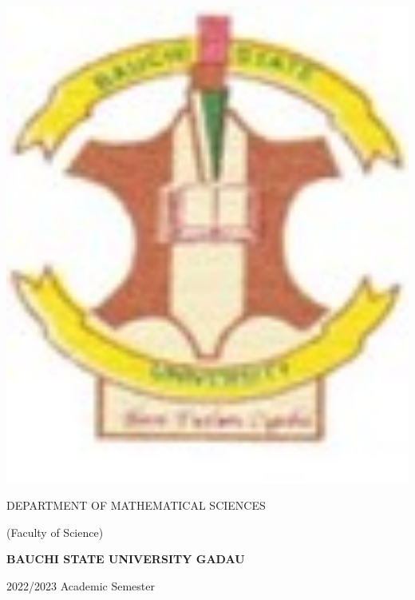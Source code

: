 \documentclass[12pt, a4paper]{exam}
\begin{document}
	\noindent
	\begin{minipage}[l]{0.1\textwidth}
		\noindent
		\includegraphics[width=1.4\textwidth]{gadau}
	\end{minipage}
\hfill
\begin{minipage}[c]{0.8\textwidth}
	\begin{center}
		{\large DEPARTMENT OF MATHEMATICAL SCIENCES \par
		\large	(Faculty of Science)	\par
	\large \textbf{BAUCHI STATE UNIVERSITY GADAU}	\par
\small	2022/2023 Academic Semester}
	\end{center}
\end{minipage}%
\end{document}
